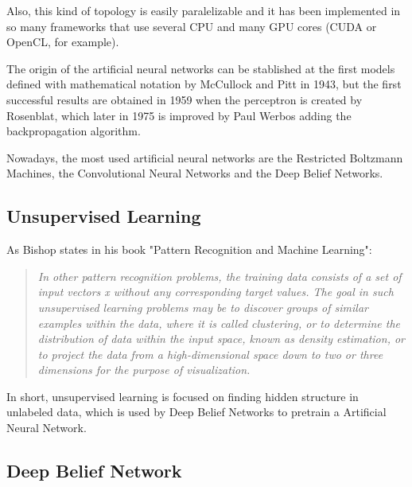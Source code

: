 \documentclass[a4paper,openany,oneside,12pt]{book}
\begin{document}
Also, this kind of topology is easily paralelizable and it has been implemented in so many frameworks that use several CPU and many GPU cores (CUDA or OpenCL, for example).

The origin of the artificial neural networks can be stablished at the first models defined with mathematical notation by McCullock and Pitt in 1943, but the first successful results are obtained in 1959 when the perceptron is created by Rosenblat, which later in 1975 is improved by Paul Werbos adding the backpropagation algorithm.

Nowadays, the most used artificial neural networks are the Restricted Boltzmann Machines, the Convolutional Neural Networks and the Deep Belief Networks.

\subsection{Unsupervised Learning}
As Bishop states in his book "Pattern Recognition and Machine Learning":
\begin{quote}
\em In other pattern recognition problems, the training data consists of a set of input vectors x without any corresponding target values. The goal in such unsupervised learning problems may be to discover groups of similar examples within the data, where it is called clustering, or to determine the distribution of data within the input space, known as density estimation, or to project the data from a high-dimensional space down to two or three dimensions for the purpose of visualization.
\end{quote}

In short, unsupervised learning is focused on finding hidden structure in unlabeled data, which is used by Deep Belief Networks to pretrain a Artificial Neural Network. \cite{Bishop}

\subsection{Deep Belief Network}
\end{document}
